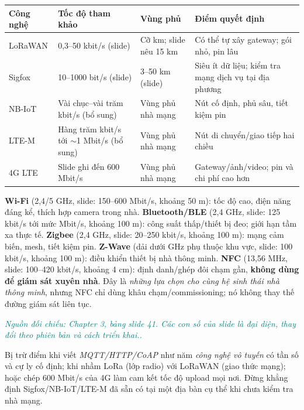 \documentclass[11pt,a4paper]{article}
\newcommand{\src}[1]{\par\noindent\textcolor{teal}{\footnotesize\textit{Nguồn đối chiếu: #1.}}\par}
\newcommand{\kw}[1]{\textbf{#1}}
\begin{document}
\begin{notesbox}[title={Bảng so sánh nhanh --- CHỈ cho tình huống nông trại diện rộng}]
\small\begin{tabularx}{\linewidth}{@{}p{18mm}p{30mm}p{26mm}X@{}}\toprule
\textbf{Công nghệ} & \textbf{Tốc độ tham khảo} & \textbf{Vùng phủ} & \textbf{Điểm quyết định}\\\midrule
LoRaWAN & 0,3--50 kbit/s (slide) & Cỡ km; slide nêu 15 km & Có thể tự xây gateway; gói nhỏ, pin lâu\\
Sigfox & 10--1000 bit/s (slide) & 3--50 km (slide) & Siêu ít dữ liệu; kiểm tra mạng dịch vụ tại địa phương\\
NB-IoT & Vài chục--vài trăm kbit/s (bổ sung) & Vùng phủ nhà mạng & Nút cố định, phủ sâu, tiết kiệm pin\\
LTE-M & Hàng trăm kbit/s tới $\sim$1 Mbit/s (bổ sung) & Vùng phủ nhà mạng & Nút di chuyển/giao tiếp hai chiều\\
4G LTE & Slide ghi đến 600 Mbit/s & Vùng phủ nhà mạng & Gateway/ảnh/video; pin và chi phí cao hơn\\\bottomrule
\end{tabularx}\normalsize\end{notesbox}
\begin{notesbox}[title={Nếu đổi tình huống thành mạng tầm ngắn --- 5 lựa chọn khác ở slide 41}]
\kw{Wi-Fi} (2,4/5 GHz, slide: 150--600 Mbit/s, khoảng 50 m): tốc độ cao, điện năng đáng kể, thích hợp camera trong nhà. \kw{Bluetooth/BLE} (2,4 GHz, slide: 125 kbit/s tới mức Mbit/s, khoảng 100 m): công suất thấp/thiết bị đeo; giới hạn tầm xa thực tế. \kw{Zigbee} (2,4 GHz, slide: 20--250 kbit/s, khoảng 100 m): mạng cảm biến, mesh, tiết kiệm pin. \kw{Z-Wave} (dải dưới GHz phụ thuộc khu vực, slide: 100 kbit/s, khoảng 100 m): điều khiển thiết bị nhà thông minh. \kw{NFC} (13,56 MHz, slide: 100--420 kbit/s, khoảng 4 cm): định danh/ghép đôi chạm gần, \kw{không dùng để giám sát xuyên nhà}. Đây là \emph{những lựa chọn cho cùng hệ sinh thái nhà thông minh}, nhưng NFC chỉ dùng khâu chạm/commissioning; nó không thay thế đường giám sát liên tục.
\src{Chapter 3, bảng slide 41. Các con số của slide là đại diện, thay đổi theo phiên bản và cách triển khai.}
\end{notesbox}
\begin{warningbox}Bị trừ điểm khi viết \emph{MQTT/HTTP/CoAP} như năm \emph{công nghệ vô tuyến} có tần số và cự ly cố định; khi nhầm LoRa (lớp radio) với LoRaWAN (giao thức mạng); hoặc chép 600 Mbit/s của 4G làm cam kết tốc độ upload mọi nơi. Đừng khẳng định Sigfox/NB-IoT/LTE-M đã sẵn có tại một địa bàn cụ thể khi chưa kiểm tra nhà mạng.\end{warningbox}
\end{document}
